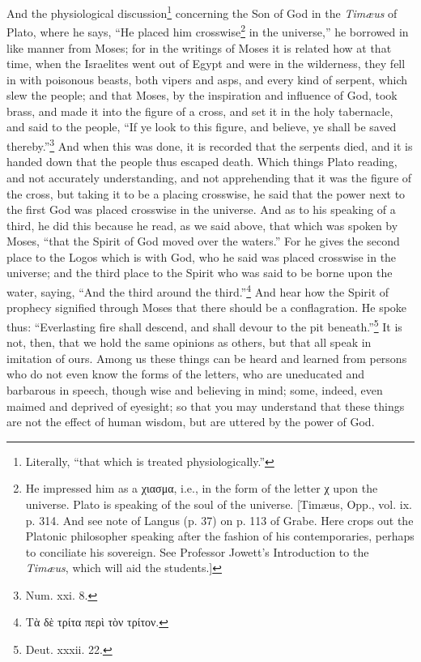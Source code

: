 And the physiological discussion\footnote{Literally, “that which is treated physiologically.”} concerning the Son of God in the \emph{Timæus} of Plato, where he says, “He placed him crosswise\footnote{He impressed him as a \textgreek{χιασμα}, i.e., in the form of the letter \textgreek{χ} upon the universe. Plato is speaking of the soul of the universe. [Timæus, Opp., vol. ix. p. 314. And see note of Langus (p. 37) on p. 113 of Grabe. Here crops out the Platonic philosopher speaking after the fashion of his contemporaries, perhaps to conciliate his sovereign. See Professor Jowett’s Introduction to the \emph{Timæus}, which will aid the students.]} in the universe,” he borrowed in like manner from Moses; for in the writings of Moses it is related how at that time, when the Israelites went out of Egypt and were in the wilderness, they fell in with poisonous beasts, both vipers and asps, and every kind of serpent, which slew the people; and that Moses, by the inspiration and influence of God, took brass, and made it into the figure of a cross, and set it in the holy tabernacle, and said to the people, “If ye look to this figure, and believe, ye shall be saved thereby.”\footnote{Num. xxi. 8.} And when this was done, it is recorded that the serpents died, and it is handed down that the people thus escaped death. Which things Plato reading, and not accurately understanding, and not apprehending that it was the figure of the cross, but taking it to be a placing crosswise, he said that the power next to the first God was placed crosswise in the universe. And as to his speaking of a third, he did this because he read, as we said above, that which was spoken by Moses, “that the Spirit of God moved over the waters.” For he gives the second place to the Logos which is with God, who he said was placed crosswise in the universe; and the third place to the Spirit who was said to be borne upon the water, saying, “And the third around the third.”\footnote{\textgreek{Τὰ δὲ τρίτα περὶ τὸν τρίτον}.} And hear how the Spirit of prophecy signified through Moses that there should be a conflagration. He spoke thus: “Everlasting fire shall descend, and shall devour to the pit beneath.”\footnote{Deut. xxxii. 22.} It is not, then, that we hold the same opinions as others, but that all speak in imitation of ours. Among us these things can be heard and learned from persons who do not even know the forms of the letters, who are uneducated and barbarous in speech, though wise and believing in mind; some, indeed, even maimed and deprived of eyesight; so that you may understand that these things are not the effect of human wisdom, but are uttered by the power of God.

